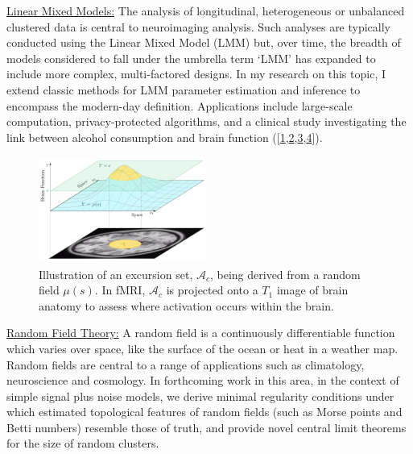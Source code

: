\documentclass{friggeri-cv}
\begin{document}
\underline{Linear Mixed Models:} The analysis of longitudinal, heterogeneous or unbalanced clustered data is central to neuroimaging analysis. Such analyses are typically conducted using the Linear Mixed Model (LMM) but, over time, the breadth of models considered to fall under the umbrella term `LMM' has expanded to include more complex, multi-factored designs. In my research on this topic, I extend classic methods for LMM parameter estimation and inference to encompass the modern-day definition. Applications include large-scale computation, privacy-protected algorithms, and a clinical study investigating the link between alcohol consumption and brain function ([\href{https://doi.org/10.1007/s11222-021-10026-6}{1},\href{https://doi.org/10.1016/j.neuroimage.2022.119729}{2},\href{https://doi.org/10.1016/j.nicl.2022.103066}{3},\href{https://doi.org/10.1007/s12021-024-09657-7}{4}]).

\begin{figure}
    \vspace*{-0.7cm}
	\includegraphics[width=0.49\textwidth]{CRfig}
	\caption{\label{fig:fMRI} Illustration of an excursion set, $\mathcal{A}_c$, being derived from a random field $\mu(s)$. In fMRI, $\mathcal{A}_c$ is projected onto a $T_1$ image of brain anatomy to assess where activation occurs within the brain.}\vspace*{-0.2cm}
\end{figure}

\underline{Random Field Theory:} A random field is a continuously differentiable function which varies over space, like the surface of the ocean or heat in a weather map. Random fields are central to a range of applications such as climatology, neuroscience and cosmology. In forthcoming work in this area, in the context of simple signal plus noise models, we derive minimal regularity conditions under which estimated topological features of random fields (such as Morse points and Betti numbers) resemble those of truth, and provide novel central limit theorems for the size of random clusters.
\end{document}
